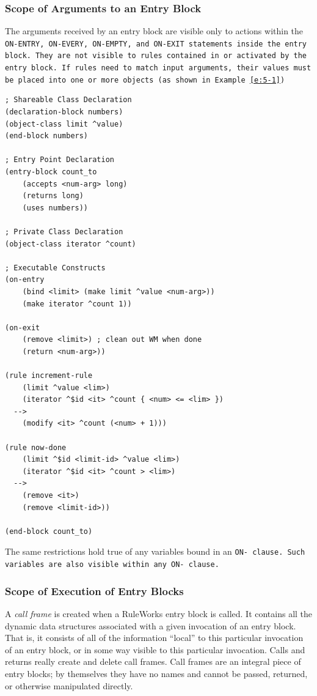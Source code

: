 \subsubsection{Scope of Arguments to an Entry Block}

The arguments received by an entry block are visible only to actions
within the \tt{ON-ENTRY}, \tt{ON-EVERY}, \tt{ON-EMPTY}, and
\tt{ON-EXIT} statements inside the entry block. They are not visible
to rules contained in or activated by the entry block. If rules need
to match input arguments, their values must be placed into one or more
objects (as shown in Example~\ref{e:5-1})

\begin{exampl}
\begin{verbatim}
; Shareable Class Declaration
(declaration-block numbers)
(object-class limit ^value)
(end-block numbers)

; Entry Point Declaration
(entry-block count_to
    (accepts <num-arg> long)
    (returns long)
    (uses numbers))

; Private Class Declaration
(object-class iterator ^count)

; Executable Constructs
(on-entry
    (bind <limit> (make limit ^value <num-arg>))
    (make iterator ^count 1))

(on-exit
    (remove <limit>) ; clean out WM when done
    (return <num-arg>))

(rule increment-rule
    (limit ^value <lim>)
    (iterator ^$id <it> ^count { <num> <= <lim> })
  -->
    (modify <it> ^count (<num> + 1)))

(rule now-done
    (limit ^$id <limit-id> ^value <lim>)
    (iterator ^$id <it> ^count > <lim>)
  -->
    (remove <it>)
    (remove <limit-id>))

(end-block count_to)
\end{verbatim}
\label{e:5-1}
\end{exampl}

The same restrictions hold true of any variables bound in an \tt{ON-}
clause. Such variables are also visible within any \tt{ON-} clause.

\subsubsection{Scope of Execution of Entry Blocks}

A \emph{call frame} is created when a RuleWorks entry block is
called. It contains all the dynamic data structures associated with a
given invocation of an entry block. That is, it consists of all of the
information ``local'' to this particular invocation of an entry block,
or in some way visible to this particular invocation. Calls and
returns really create and delete call frames. Call frames are an
integral piece of entry blocks; by themselves they have no names and
cannot be passed, returned, or otherwise manipulated directly.

